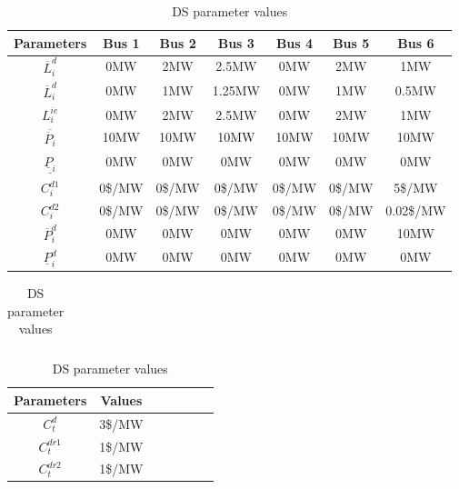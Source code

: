 \begin{table}[h]
\centering
\begin{tabular}{ |c|c|c|c|c|c|c| } 
 \hline
Parameters & Bus 1 & Bus 2& Bus 3& Bus 4& Bus 5& Bus 6\\ 
 \hline
$\overline{L}^d_{i}$ & 0MW & 2MW & 2.5MW & 0MW & 2MW & 1MW\\ 
 \hline
$\overline{L}^d_{i}$ & 0MW & 1MW & 1.25MW & 0MW & 1MW & 0.5MW  \\ 
 \hline
$L^{ie}_{i}$ & 0MW & 2MW & 2.5MW & 0MW & 2MW & 1MW  \\ 
 \hline
$\overline{\overline{P}_{i}}$ & 10MW & 10MW & 10MW & 10MW & 10MW & 10MW  \\ 
 \hline
$\underline{\underline{P}_{i}}$ & 0MW & 0MW & 0MW & 0MW & 0MW & 0MW  \\ 
 \hline
$C^{d1}_{i}$ & 0\$/MW & 0\$/MW & 0\$/MW & 0\$/MW & 0\$/MW & 5\$/MW   \\ 
 \hline
$C^{d2}_{i}$ & 0\$/MW & 0\$/MW & 0\$/MW & 0\$/MW & 0\$/MW & 0.02\$/MW   \\ 
 \hline
$\overline P^d_i$ & 0MW & 0MW & 0MW & 0MW & 0MW & 10MW \\ 
 \hline
 $\underline P^d_i$ & 0MW & 0MW & 0MW & 0MW & 0MW & 0MW  \\ 
 \hline
\end{tabular}

\begin{tabular}{ |c|c|c|c|c|c|c| } 
 \hline

\end{tabular}
 
\begin{tabular}{ |c|c|c|c|c|c|c| } 
 \hline
Parameters & Values\\ 
 \hline
$C^{d}_t$ & 3\$/MW  \\ 
 \hline
 $C^{dr1}_t$ & 1\$/MW  \\ 
 \hline
$C^{dr2}_t$ & 1\$/MW  \\ 
 \hline
\end{tabular}
\caption{DS parameter values}
 \label{wdlevel}
\end{table} 